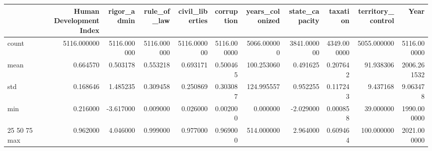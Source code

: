 \begin{tabular}{lrrrrrrrrrr}
\toprule
 & Human Development Index & rigor_admin & rule_of_law & civil_liberties & corruption & years_colonized & state_capacity & taxation & territory_control & Year \\
\midrule
count & 5116.000000 & 5116.000000 & 5116.000000 & 5116.000000 & 5116.000000 & 5066.000000 & 3841.000000 & 4349.000000 & 5055.000000 & 5116.000000 \\
mean & 0.664570 & 0.503178 & 0.553218 & 0.693171 & 0.500465 & 100.253060 & 0.491625 & 0.207642 & 91.938306 & 2006.261532 \\
std & 0.168646 & 1.485235 & 0.309458 & 0.250869 & 0.303087 & 124.995557 & 0.952255 & 0.117243 & 9.437168 & 9.063478 \\
min & 0.216000 & -3.617000 & 0.009000 & 0.026000 & 0.002000 & 0.000000 & -2.029000 & 0.000858 & 39.000000 & 1990.000000 \\
25%
50%
75%
max & 0.962000 & 4.046000 & 0.999000 & 0.977000 & 0.969000 & 514.000000 & 2.964000 & 0.609464 & 100.000000 & 2021.000000 \\
\bottomrule
\end{tabular}
